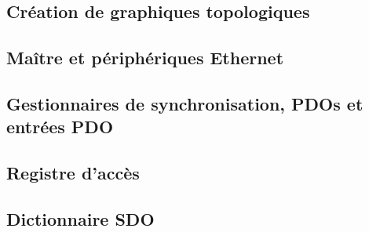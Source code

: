 \documentclass[a4paper,12pt,BCOR6mm,bibtotoc,idxtotoc]{scrbook}
\begin{document}





\subsection{Cr\'eation de graphiques topologiques}




\subsection{Ma\^itre et p\'eriph\'eriques Ethernet}




\subsection{Gestionnaires de synchronisation, PDOs et entr\'ees PDO}




\subsection{Registre d'acc\`es}
\label{sec:regaccess}






\subsection{Dictionnaire SDO}
\end{document}
